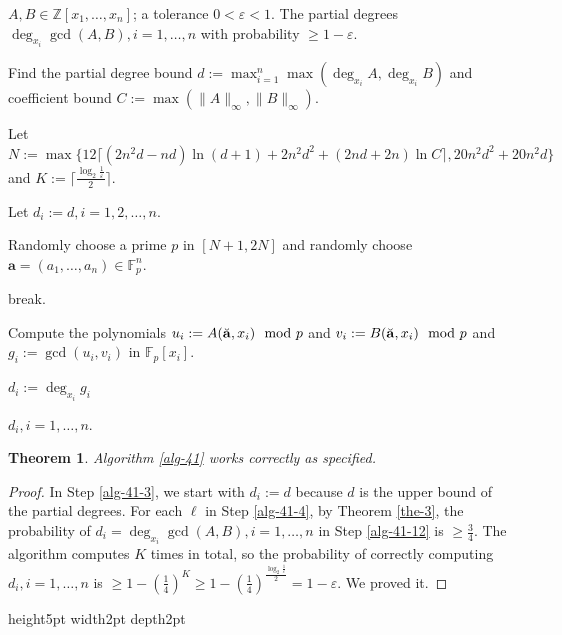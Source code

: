 \documentclass[final,20pt]{elsarticle}
\newtheorem{theorem}{Theorem}[section]
\def\Z{{\mathbb Z}}
\def\F{{\mathbb{F}}}
\def\LC{\hbox{\rm{LC}}}
\def\qed{\hfil {\vrule height5pt width2pt depth2pt}}
\begin{document}
\begin{algorithm}[H]
\caption{Computing partial degrees of the GCD.}\label{alg-41}
\begin{algorithmic}[1]
\REQUIRE $A,B\in \Z[x_1,\dots,x_n]$; a tolerance $0<\varepsilon<1$.
\ENSURE The partial degrees $\deg_{x_i}\gcd(A,B),i=1,\dots,n$ with probability $\geq 1-\varepsilon$.

\STATE Find the partial degree bound $d:=\max_{i=1}^n \max(\deg_{x_i}A,\deg_{x_i}B)$ and coefficient bound $C:=\max(\|A\|_\infty,  \|B\|_\infty)$.

\STATE Let $N:=\max\{ 12
\lceil (2n^2d-nd)\ln(d+1)+2n^2d^2+(2nd+2n)\ln C\rceil,20n^2d^2+20n^2d\}$ and $K:=\lceil \frac{\log_2 \frac{1}{\varepsilon}}{2}\rceil$.\label{alg-41-2}\

\STATE Let $d_i:=d,i=1,2,\dots,n$.\label{alg-41-3}

\STATE Randomly choose a prime $p$ in $[N+1,2N]$ and randomly choose $\mathbf{a}=(a_1,\dots,a_{n})\in \F^{n}_p$.\label{alg-41-5}


\IF{$\LC_{x_i}(A)(\mathbf{a}) \mod p=0$ or $\LC_{x_i}(B)(\mathbf{a})\mod p=0$}
\STATE break.
\ENDIF

\STATE Compute the polynomials $u_i:=A(\Breve{\mathbf{a}},x_i)\mod p$ and $v_i:=B(\Breve{\mathbf{a}},x_i)\mod p$ and $g_i:=\gcd(u_i,v_i)$ in $\F_p[x_i]$.\label{alg-41-10}

\STATE $d_i:=\deg_{x_i}g_i$\label{alg-41-12}
\ENDIF


\ENDFOR \label{alg-41-14}
\ENDFOR \label{alg-41-15}
\RETURN $d_i,i=1,\dots,n$.
\end{algorithmic}
\end{algorithm}


\begin{theorem}\label{the-16}
Algorithm \ref{alg-41} works correctly as specified.
\end{theorem}
\begin{proof}
In Step \ref{alg-41-3}, we start with $d_i:=d$ because $d$ is the upper bound of the partial degrees.
%
For each $\ell$ in Step \ref{alg-41-4}, by Theorem \ref{the-3}, the probability of $d_i=\deg_{x_i}\gcd(A,B),i=1,\dots,n$ in Step \ref{alg-41-12} is $\geq \frac34$. The algorithm computes $K$ times in total, so the probability of correctly computing  $d_i,i=1,\dots,n$ is $\geq 1-(\frac14)^K\geq 1-(\frac14)^{\frac{\log_2 \frac{1}{\varepsilon}}{2}}=1-\varepsilon$. We proved it.
\end{proof}\qed
\end{document}
